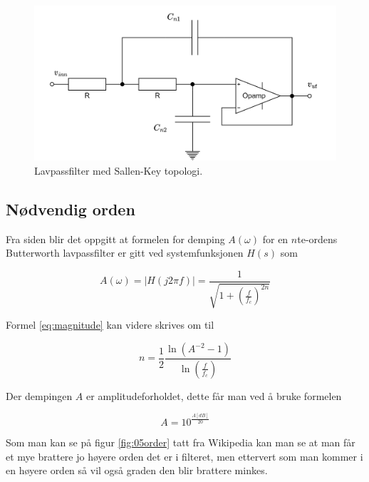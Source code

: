 \begin{figure}[H]
	\centering
	\includegraphics[scale=0.15]{./Images/02Concept/03SallenKey.png}
	\caption{Lavpassfilter med Sallen-Key topologi.\cite{pham_2022_selvlaget}}
	\label{fig:04SallenKey}
\end{figure}

\subsection{Nødvendig orden}
\label{sec:Nødvendig_orden}

Fra siden \cite{wikipediacontributors_2022_butterworth} blir det oppgitt at formelen for demping $A(\omega)$ for en $n$te-ordens Butterworth lavpassfilter er gitt ved systemfunksjonen $H(s)$ som

\begin{equation}
	A(\omega)=|H(j2\pi f)|=\frac{1}{\sqrt{1+(\frac{f}{f_c})^{2n}}}
	\label{eq:magnitude}
\end{equation}


Formel \ref{eq:magnitude} kan videre skrives om til

\begin{equation}
	n=\frac{1}{2}\frac{\ln(A^{-2}-1)}{\ln(\frac{f}{f_c})}
	\label{eq:order}
\end{equation}

Der dempingen $A$ er amplitudeforholdet, dette får man ved å bruke formelen

\begin{equation}
	A=10^{\frac{A[dB]}{20}}
	\label{eq:decibeltonone}
\end{equation}

Som man kan se på figur \ref{fig:05order} tatt fra Wikipedia \cite{wikipediacontributors_2022_butterworth} kan man se at man får et mye brattere jo høyere orden det er i filteret, men ettervert som man kommer i en høyere orden så vil også graden den blir brattere minkes. 

